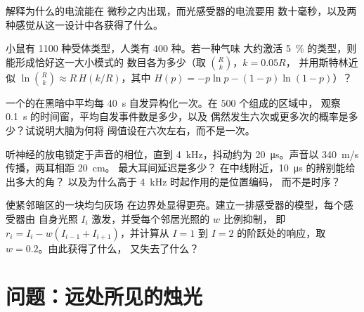 \begin{exercise}[$\star\star$]\label{exo:b3:sensory-systems:8}
解释为什么的电流能在
微秒之内出现，而光感受器的电流要用
数十毫秒，以及两种感觉从这一设计中各获得了什么。
\end{exercise}

\begin{exercise}[$\star\star$]\label{exo:b3:sensory-systems:9}
小鼠有 \num{1100} 种受体类型，人类有 $400$ 种。若一种气味
大约激活 \qty{5}{\%} 的类型，则能形成恰好这一大小模式的
数目各为多少（取 $\binom{R}{k}$，$k = 0.05R$，
并用斯特林近似 $\ln\binom{R}{k} \approx R\,H(k/R)$，其中
$H(p) = -p\ln p - (1-p)\ln(1-p)$）？
\end{exercise}

\begin{exercise}[$\star\star\star$]\label{exo:b3:sensory-systems:10}
一个的在黑暗中平均每
\qty{40}{s} 自发异构化一次。在 $500$ 个组成的区域中，
观察 \qty{0.1}{s} 的时间窗，平均自发事件数是多少，以及
偶然发生六次或更多次的概率是多少？试说明大脑为何将
阈值设在六次左右，而不是一次。
\end{exercise}

\begin{exercise}[$\star\star\star$]\label{exo:b3:sensory-systems:11}
听神经的放电锁定于声音的相位，直到
\qty{4}{kHz}，抖动约为 \qty{20}{\micro s}。声音以 \qty{340}{m/s} 传播，两耳相距 \qty{20}{cm}。
最大耳间延迟是多少？
在中线附近，\qty{10}{\micro s} 的辨别能给出多大的角？
以及为什么高于 \qty{4}{kHz} 时起作用的是位置编码，
而不是时序？
\end{exercise}

\begin{exercise}[$\star\star\star$]\label{exo:b3:sensory-systems:12}
使紧邻暗区的一块均匀灰场
在边界处显得更亮。建立一排感受器的模型，每个感受器由
自身光照 $I_{i}$ 激发，并受每个邻居光照的 $w$ 比例抑制，
即 $r_{i} = I_{i} - w(I_{i-1} + I_{i+1})$，并计算从
$I = 1$ 到 $I = 2$ 的阶跃处的响应，取 $w = 0.2$。由此获得了什么，
又失去了什么？
\end{exercise}

\section{问题：远处所见的烛光}

